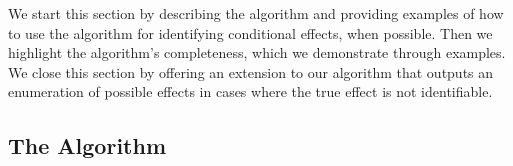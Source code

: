 \documentclass[11pt]{article}
\begin{document}
We start this section by describing the algorithm and providing examples of how to use the algorithm for identifying conditional effects, when possible. Then we highlight the algorithm's completeness, which we demonstrate through examples. We close this section by offering an extension to our algorithm that outputs an enumeration of possible effects in cases where the true effect is not identifiable.






\subsection{The Algorithm}
\end{document}
